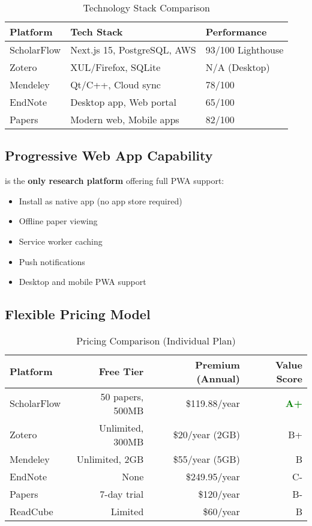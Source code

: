 \begin{table}[H]
\centering
\caption{Technology Stack Comparison}
\label{tab:tech-stack-comparison}
\begin{tabular}{@{}lll@{}}
\toprule
\textbf{Platform} & \textbf{Tech Stack} & \textbf{Performance} \\
\midrule
ScholarFlow & Next.js 15, PostgreSQL, AWS & 93/100 Lighthouse \\
Zotero & XUL/Firefox, SQLite & N/A (Desktop) \\
Mendeley & Qt/C++, Cloud sync & 78/100 \\
EndNote & Desktop app, Web portal & 65/100 \\
Papers & Modern web, Mobile apps & 82/100 \\
\bottomrule
\end{tabular}
\end{table}

\subsection{Progressive Web App Capability}

\projectname{} is the \textbf{only research platform} offering full PWA support:
\begin{itemize}[leftmargin=*]
    \item Install as native app (no app store required)
    \item Offline paper viewing
    \item Service worker caching
    \item Push notifications
    \item Desktop and mobile PWA support
\end{itemize}

\subsection{Flexible Pricing Model}

\begin{table}[H]
\centering
\caption{Pricing Comparison (Individual Plan)}
\label{tab:pricing-comparison}
\begin{tabular}{@{}lrrr@{}}
\toprule
\textbf{Platform} & \textbf{Free Tier} & \textbf{Premium (Annual)} & \textbf{Value Score} \\
\midrule
ScholarFlow & 50 papers, 500MB & \$119.88/year & \textcolor{green}{\textbf{A+}} \\
Zotero & Unlimited, 300MB & \$20/year (2GB) & B+ \\
Mendeley & Unlimited, 2GB & \$55/year (5GB) & B \\
EndNote & None & \$249.95/year & C- \\
Papers & 7-day trial & \$120/year & B- \\
ReadCube & Limited & \$60/year & B \\
\bottomrule
\end{tabular}
\end{table}

